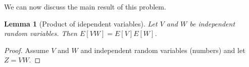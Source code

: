 \documentclass[11pt]{article}
\newtheorem{lemma}{Lemma}%
\begin{document}
    We can now discuss the main result of this problem.
\begin{lemma}[Product of idependent variables]
    Let $V$ and $W$ be independent random variables. Then $E[VW] = E[V]E[W]$.
\end{lemma}
\begin{proof}
    Assume $V$ and $W$ and independent random variables (numbers) and let $Z=VW$.
    

\end{proof}
\end{document}
